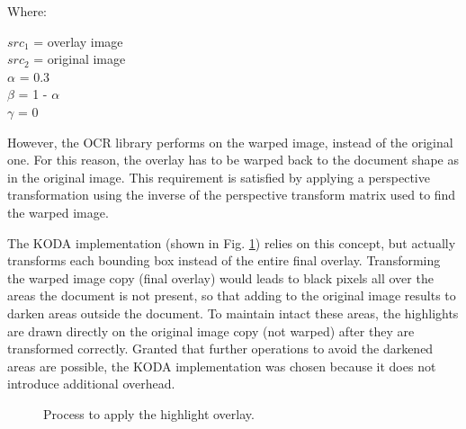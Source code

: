 \documentclass[a4paper]{article}
\begin{document}
Where:

\begin{center}
	$src_1$ = overlay image \\
	$src_2$ = original image \\
	$\alpha$ = 0.3  \\
	$\beta$ = 1 - $\alpha$ \\
	$\gamma$ = 0 
\end{center}

However, the OCR library performs on the warped image, instead of the original one. For this reason, the overlay has to be warped back to the document shape as in the original image. This requirement is satisfied by applying a perspective transformation using the inverse of the perspective transform matrix used to find the warped image. 

The KODA implementation (shown in Fig. \ref{fig:keywordhighliting}) relies on this concept, but actually transforms each bounding box instead of the entire final overlay. Transforming the warped image copy (final overlay) would leads to black pixels all over the areas the document is not present, so that adding to the original image results to darken areas outside the document. To maintain intact these areas, the highlights are drawn directly on the original image copy (not warped) after they are transformed correctly. Granted that further operations to avoid the darkened areas are possible, the KODA implementation was chosen because it does not introduce additional overhead.

\begin{figure}[H]
	\caption{Process to apply the highlight overlay.}
	\label{fig:keywordhighliting}
\end{figure}
\end{document}
